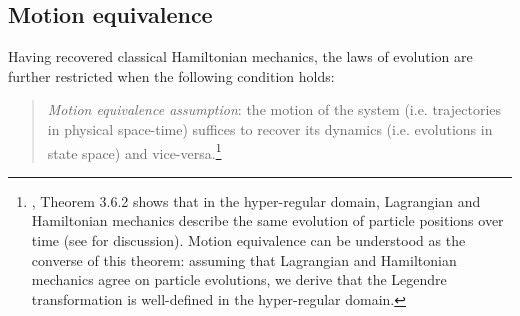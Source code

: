 \documentclass[letterpaper]{article}
\begin{document}
\subsection{Motion equivalence}
\label{motion}

Having recovered classical Hamiltonian mechanics, the laws of evolution are further restricted when the following condition holds:

\begin{quotation}
\noindent
\textit{Motion equivalence assumption}: the motion of the system (i.e. trajectories in physical space-time) suffices to recover its dynamics (i.e. evolutions in state space) and vice-versa.\footnote{ \textcites[]{Abraham}, Theorem 3.6.2 shows that in the hyper-regular domain, Lagrangian and Hamiltonian mechanics describe the same evolution of particle positions over time (see \textcites[1180-1181]{Barrett2} for discussion). Motion equivalence can be understood as the converse of this theorem: assuming that Lagrangian and Hamiltonian mechanics agree on particle evolutions, we derive that the Legendre transformation is well-defined in the hyper-regular domain.}
\end{quotation}
\end{document}
